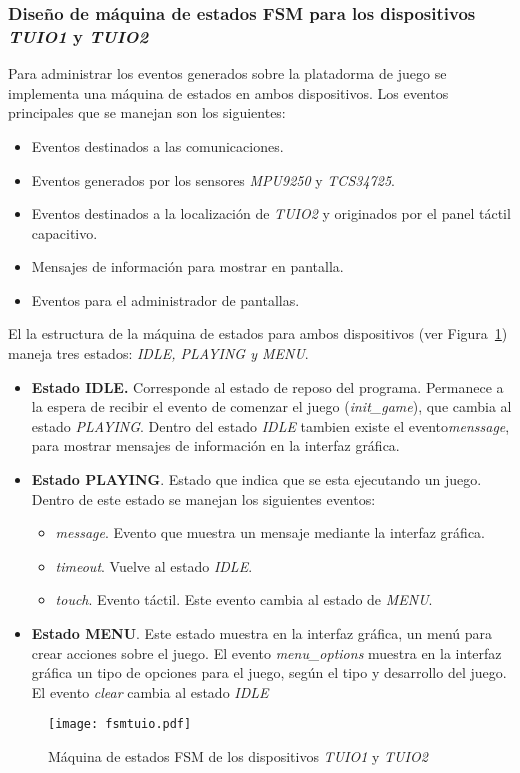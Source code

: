 \subsubsection{Diseño de máquina de estados FSM para los dispositivos \emph{TUIO1} y \emph{TUIO2}}
Para administrar los eventos generados sobre la platadorma de juego se implementa una máquina de estados en ambos dispositivos. Los eventos principales que se manejan son los siguientes:
\begin{itemize}
\item Eventos destinados a las comunicaciones.
\item Eventos generados por los sensores \emph{MPU9250} y \emph{TCS34725}.
\item Eventos destinados a la localización de \emph{TUIO2} y originados por el panel táctil capacitivo.
\item Mensajes de información para mostrar en pantalla.
\item Eventos para el administrador de pantallas.
\end{itemize}
El la estructura de la máquina de estados para ambos dispositivos (ver Figura~\ref{fig:fsmtuio}) maneja tres estados: \emph{IDLE, PLAYING y MENU}.
\begin{itemize}
\item \textbf{Estado IDLE.} Corresponde al estado de reposo del programa. Permanece a la espera de recibir el evento de comenzar el juego (\emph{init\_game}), que cambia al estado \emph{PLAYING}. Dentro del estado \emph{IDLE} tambien existe el evento\emph{menssage}, para mostrar mensajes de información en la interfaz gráfica.
\item \textbf{Estado PLAYING}. Estado que indica que se esta ejecutando un juego. Dentro de este estado se manejan los siguientes eventos:
\begin{itemize}
        \item \emph{message}. Evento que muestra un mensaje mediante la interfaz gráfica.
        \item \emph{timeout}. Vuelve al estado \emph{IDLE}.
        \item \emph{touch}. Evento táctil. Este evento cambia al estado de \emph{MENU}.
\end{itemize}
\item \textbf{Estado MENU}. Este estado muestra en la interfaz gráfica, un menú para crear acciones sobre el juego. El evento \emph{menu\_options} muestra en la interfaz gráfica un tipo de opciones para el juego, según el tipo y desarrollo del juego. El evento \emph{clear} cambia al estado \emph{IDLE}
\end{itemize}
\begin{figure}[!h]
\begin{center}
\texttt{[image: fsmtuio.pdf]}
\caption{Máquina de estados FSM de los dispositivos \emph{TUIO1} y \emph{TUIO2} }
\label{fig:fsmtuio}
\end{center}
\end{figure}
